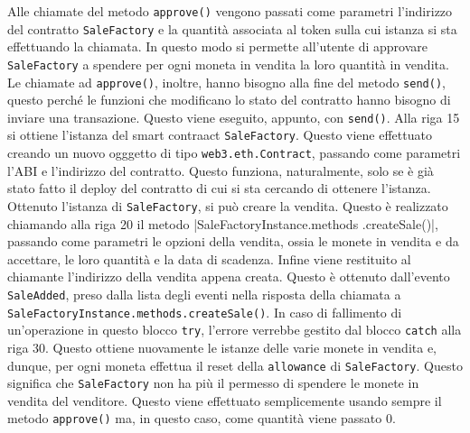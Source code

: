 \documentclass[a4paper]{article}
\begin{document}
        Alle chiamate del metodo \verb|approve()| vengono passati come parametri l'indirizzo del contratto \verb|SaleFactory| e la quantità associata al token sulla cui istanza si sta effettuando la chiamata.
        In questo modo si permette all'utente di approvare \verb|SaleFactory| a spendere per ogni moneta in vendita la loro quantità in vendita.
        \newline
        Le chiamate ad \verb|approve()|, inoltre, hanno bisogno alla fine del metodo \verb|send()|,
        questo perché le funzioni che modificano lo stato del contratto hanno bisogno di inviare una transazione. Questo viene eseguito, appunto, con \verb|send()|\cite{soliditysend}.
        \newline
        Alla riga 15 si ottiene l'istanza del smart contraact \verb|SaleFactory|. Questo viene effettuato creando un nuovo ogggetto di tipo \verb|web3.eth.Contract|, passando come parametri l'ABI e l'indirizzo del contratto.
        Questo funziona, naturalmente, solo se è già stato fatto il deploy del contratto di cui si sta cercando di ottenere l'istanza.
        \newline
        Ottenuto l'istanza di \verb|SaleFactory|, si può creare la vendita. Questo è realizzato chiamando alla riga 20 il metodo \spverb|SaleFactoryInstance.methods .createSale()|, passando come parametri le opzioni della vendita,
        ossia le monete in vendita e da accettare, le loro quantità e la data di scadenza.
        \newline
        Infine viene restituito al chiamante l'indirizzo della vendita appena creata. Questo è ottenuto dall'evento \verb|SaleAdded|, preso dalla lista degli eventi nella risposta della chiamata a \verb|SaleFactoryInstance.methods.createSale()|.
        \newline
        In caso di fallimento di un'operazione in questo blocco \verb|try|, l'errore verrebbe gestito dal blocco \verb|catch| alla riga 30. Questo ottiene nuovamente le istanze delle varie monete in vendita e, dunque, per ogni moneta effettua il reset della
        \verb|allowance| di \verb|SaleFactory|. Questo significa che \verb|SaleFactory| non ha più il permesso di spendere le monete in vendita del venditore. Questo viene effettuato semplicemente usando sempre il metodo \verb|approve()| ma, in questo caso,
        come quantità viene passato 0.
\end{document}
